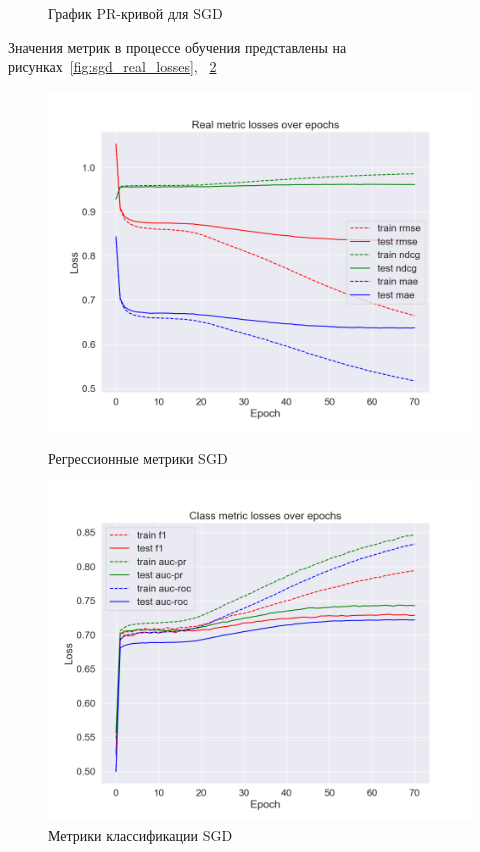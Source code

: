 \begin{figure}[h!]
\begin{minipage}{.5\textwidth}
\caption{График PR-кривой для SGD}
\label{fig:sgd_pr}
\end{minipage}
\end{figure}

Значения метрик в процессе обучения представлены на рисунках~\ref{fig:sgd_real_losses}, ~\ref{fig:sgd_class_losses}

\begin{figure}[h!]
\centering
\begin{minipage}{.5\textwidth}
\centering
\includegraphics[width=1.0\linewidth]{images/sgd/real_losses}
\caption{Регрессионные метрики SGD}
\label{fig:sgd_real_losses}
\end{minipage}%
\begin{minipage}{.5\textwidth}
\centering
\includegraphics[width=1.0\linewidth]{images/sgd/class_losses}
\caption{Метрики классификации SGD}
\label{fig:sgd_class_losses}
\end{minipage}
\end{figure}

